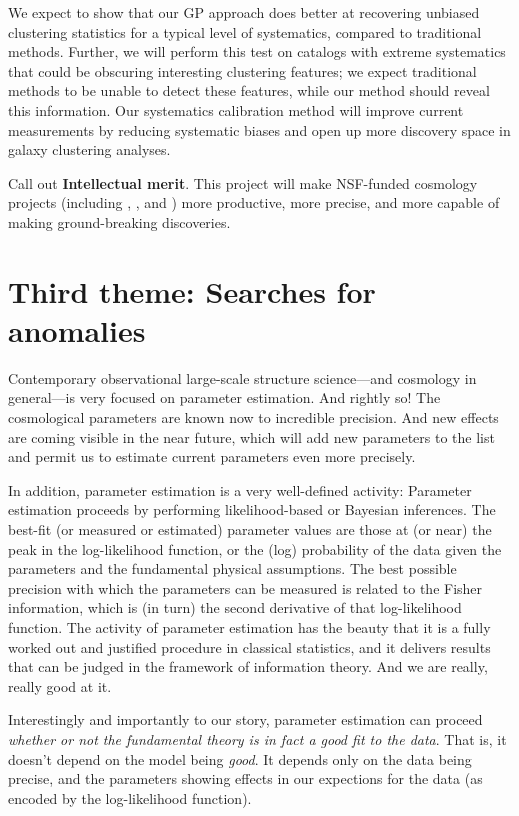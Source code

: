 \documentclass[12pt, fullpage, letterpaper]{article}
\begin{document}
We expect to show that our GP approach does better at recovering unbiased clustering statistics for a typical level of systematics, compared to traditional methods.
Further, we will perform this test on catalogs with extreme systematics that could be obscuring interesting clustering features; we expect traditional methods to be unable to detect these features, while our method should reveal this information.
Our systematics calibration method will improve current measurements by reducing systematic biases and open up more discovery space in galaxy clustering analyses.

Call out \textbf{Intellectual merit}.
This project will make NSF-funded cosmology projects (including
\SDSSIV, \DESI, and \LSST) more productive, more precise, and more
capable of making ground-breaking discoveries.



\section{Third theme: Searches for anomalies}

Contemporary observational large-scale structure science---and
cosmology in general---is very focused on parameter estimation.
And rightly so!
The cosmological parameters are known now to incredible precision.
And new effects are coming visible in the near future, which will add
new parameters to the list and permit us to estimate current
parameters even more precisely.

In addition, parameter estimation is a very well-defined activity:
Parameter estimation proceeds by performing likelihood-based or
Bayesian inferences.
The best-fit (or measured or estimated) parameter values are those at
(or near) the peak in the log-likelihood function, or the (log)
probability of the data given the parameters and the fundamental
physical assumptions.
The best possible precision with which the parameters can be measured
is related to the Fisher information, which is (in turn) the second
derivative of that log-likelihood function.
The activity of parameter estimation has the beauty that it is a fully
worked out and justified procedure in classical statistics, and it
delivers results that can be judged in the framework of information
theory.
And we are really, really good at it.

Interestingly and importantly to our story,
parameter estimation can proceed \emph{whether or not the fundamental theory
is in fact a good fit to the data}.
That is, it doesn't depend on the model being \emph{good}.
It depends only on the data being precise, and the parameters showing
effects in our expections for the data (as encoded by the log-likelihood function).
\end{document}

